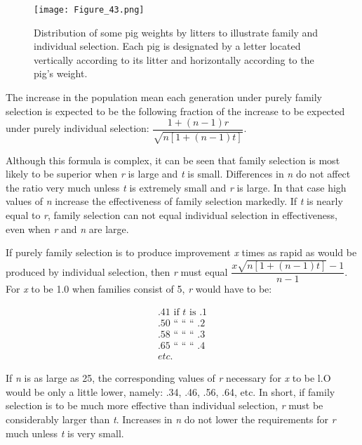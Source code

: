 \begin{figure}
	\centering
    \texttt{[image: Figure\_43.png]}
    \caption{Distribution of some pig weights by litters to illustrate family and individual
			 selection. Each pig is designated by a letter located vertically according to its
			 litter and horizontally according to the pig's weight.}
    \label{fig:Lush_Figure_43}
\end{figure}

The increase in the population mean each generation under purely
family selection is expected to be the following fraction of the increase
to be expected under purely individual selection: \(\dfrac{1 + (n - 1)r}{\sqrt{n[1 + (n - 1)t]}}\).

Although this formula is complex, it can be seen that family selection
is most likely to be superior when \textit{r} is large and \textit{t} is small. Differences
in \textit{n} do not affect the ratio very much unless \textit{t} is extremely small
and \textit{r} is large. In that case high values of \textit{n} increase the effectiveness of
family selection markedly. If \textit{t} is nearly equal to \textit{r}, family selection can not
equal individual selection in effectiveness, even when \textit{r} and \textit{n} are
large.

\nowidow
If purely family selection is to produce improvement \textit{x} times as
rapid as would be produced by individual selection, then \textit{r} must equal
\(\dfrac{x\sqrt{n[1 + (n - 1)t]} - 1}{n - 1}\). For \textit{x} to be 1.0 when families
consist of 5, \textit{r} would have to be:

\begin{gather*}
.41 \text{ if } t \text{ is } .1 \\
.50 \text{ `` `` `` } .2 \\
.58 \text{ `` `` `` } .3 \\
.65 \text{ `` `` `` } .4 \\
etc.
\end{gather*}

If \textit{n} is as large as 25, the corresponding values of \textit{r} necessary
for \textit{x} to be l.O would be only a little lower, namely: .34, .46, .56, .64,
etc. In short, if family selection is to be much more effective than individual
selection, \textit{r} must be considerably larger than \textit{t}. Increases in
\textit{n} do not lower the requirements for \textit{r} much unless \textit{t} is very small.

